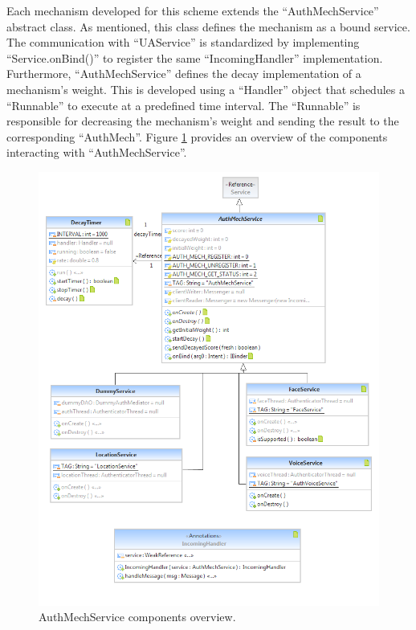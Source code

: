 Each mechanism developed for this scheme extends the ``AuthMechService'' abstract class. As mentioned, this class defines the mechanism as a bound service. The communication with ``UAService'' is standardized by implementing ``Service.onBind()'' to register the same ``IncomingHandler'' implementation. Furthermore, ``AuthMechService'' defines the decay implementation of a mechanism's weight. This is developed using a ``Handler'' object that schedules a ``Runnable'' to execute at a predefined time interval. The ``Runnable'' is responsible for decreasing the mechanism's weight and sending the result to the corresponding ``AuthMech''. Figure \ref{fig:authmechservice} provides an overview of the components interacting with ``AuthMechService''.
\begin{figure}[h]
    \centering
    \includegraphics[width=\textwidth]{Pictures/authmechservice}
    \caption{AuthMechService components overview.}
    \label{fig:authmechservice}
\end{figure}

